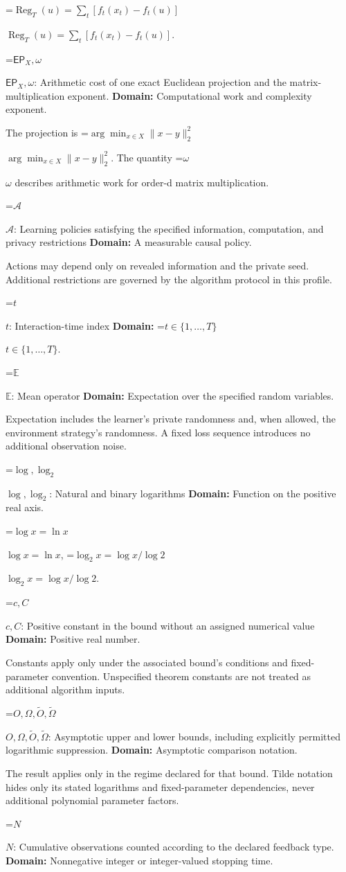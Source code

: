 \documentclass[10pt,a4paper]{article}
\newcommand{\AtlasMath}[1]{\par\begingroup\centering\setbox0=\hbox{$\displaystyle #1$}\ifdim\wd0>1.4\linewidth\typeout{ATLAS WIDE FORMULA: \the\wd0}\fi\ifdim\wd0>\linewidth\resizebox{\linewidth}{!}{\box0}\else\box0\fi\par\endgroup}
\newcommand{\AtlasInlineMath}[1]{\begingroup\setbox0=\hbox{$#1$}\ifdim\wd0>.4\linewidth\endgroup\AtlasMath{#1}\else\endgroup$#1$\fi}
\begin{document}
\AtlasInlineMath{\operatorname{Reg}_T(u)=\sum_t[f_t(x_t)-f_t(u)]}.

\AtlasInlineMath{\mathsf{EP}_X,\omega}: Arithmetic cost of one exact Euclidean projection and the matrix-multiplication exponent. \textbf{Domain:} Computational work and complexity exponent.

The projection is \AtlasInlineMath{\arg\min_{x\in X}\|x-y\|_2^2}. The quantity \AtlasInlineMath{\omega} describes arithmetic work for order-d matrix multiplication.

\AtlasInlineMath{\mathcal A}: Learning policies satisfying the specified information, computation, and privacy restrictions \textbf{Domain:} A measurable causal policy.

Actions may depend only on revealed information and the private seed. Additional restrictions are governed by the algorithm protocol in this profile.

\AtlasInlineMath{t}: Interaction-time index \textbf{Domain:} \AtlasInlineMath{t\in\{1,\ldots,T\}}.

\AtlasInlineMath{\mathbb E}: Mean operator \textbf{Domain:} Expectation over the specified random variables.

Expectation includes the learner's private randomness and, when allowed, the environment strategy's randomness. A fixed loss sequence introduces no additional observation noise.

\AtlasInlineMath{\log,\log_2}: Natural and binary logarithms \textbf{Domain:} Function on the positive real axis.

\AtlasInlineMath{\log x=\ln x}, \AtlasInlineMath{\log_2x=\log x/\log2}.

\AtlasInlineMath{c,C}: Positive constant in the bound without an assigned numerical value \textbf{Domain:} Positive real number.

Constants apply only under the associated bound’s conditions and fixed-parameter convention. Unspecified theorem constants are not treated as additional algorithm inputs.

\AtlasInlineMath{O,\Omega,\widetilde O,\widetilde\Omega}: Asymptotic upper and lower bounds, including explicitly permitted logarithmic suppression. \textbf{Domain:} Asymptotic comparison notation.

The result applies only in the regime declared for that bound. Tilde notation hides only its stated logarithms and fixed-parameter dependencies, never additional polynomial parameter factors.

\AtlasInlineMath{N}: Cumulative observations counted according to the declared feedback type. \textbf{Domain:} Nonnegative integer or integer-valued stopping time.
\end{document}
